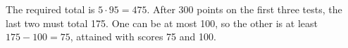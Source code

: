 The required total is $5\cdot95=475$. After 300 points on the first three tests, the last two must total 175. One can be at most 100, so the other is at least $175-100=\boxed{75}$, attained with scores 75 and 100.

